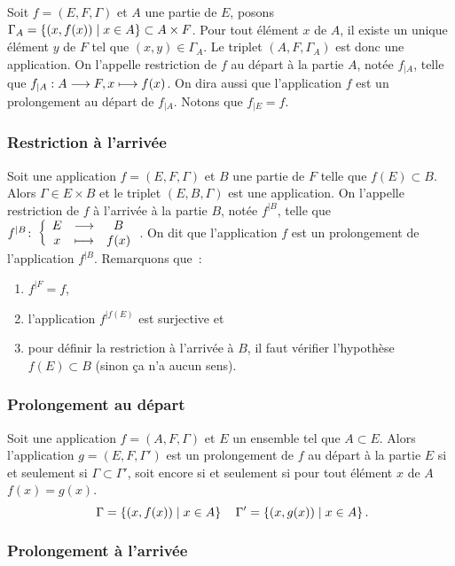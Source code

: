 Soit \(f=(E,F,\Gamma)\) et \(A\) une partie de \(E\), posons 
\(\Gamma_A=\left\{(x,f(x))\mathrel{}\middle|\mathrel{}x \in A\right\} \subset A \times F\). Pour tout élément 
\(x\) de \(A\), il existe un unique élément \(y\) de \(F\) tel que \((x,y) \in 
\Gamma_A\). Le triplet \((A,F, \Gamma_A)\) est donc une application. On 
l'appelle restriction de \(f\) au départ à la partie \(A\), notée \(f_{|A}\), 
telle que \(f_{|A}:A \longrightarrow F, x \longmapsto f(x)\). On dira aussi que l'application 
\(f\) est un prolongement au départ de \(f_{|A}\). Notons que \(f_{|E}=f\).

\subsubsection{Restriction à l'arrivée}
\label{chap3-subsubsec:restrictionarr}

Soit une application \(f=(E,F,\Gamma)\) et \(B\) une partie de \(F\) telle que 
\(f(E) \subset B\). Alors \(\Gamma \in E \times B\) et le triplet 
\((E,B,\Gamma)\) est une application. On l'appelle restriction de \(f\) à 
l'arrivée à la partie \(B\), notée \(f^{|B}\), telle que 
\(f^{|B}\colon \left\{\begin{array}{ccc} E & \longrightarrow &B\\ x & \longmapsto & f(x) \end{array} \right.\). On dit que l'application \(f\) est un 
prolongement de l'application \(f^{|B}\). Remarquons que~:
\begin{enumerate}
    \item \(f^{|F}=f\), 
    \item l'application \(f^{|f(E)}\) est surjective et 
    \item pour définir la restriction à l'arrivée à \(B\), il faut vérifier 
        l'hypothèse \(f(E) \subset B\) (sinon ça n'a aucun sens).
\end{enumerate}

\subsubsection{Prolongement au départ}
\label{chap3-subsubsec:prolongementdep}

Soit une application \(f=(A,F,\Gamma)\) et \(E\) un ensemble tel que \(A \subset 
E\). Alors l'application \(g=(E,F,\Gamma')\) est un prolongement de \(f\) au 
départ à la partie \(E\) si et seulement si \(\Gamma \subset \Gamma'\), soit 
encore si et seulement si pour tout élément \(x\) de \(A\) \(f(x)=g(x)\).
\begin{equation}\
    \Gamma=\left\{(x,f(x))\mathrel{}\middle|\mathrel{}x \in A\right\} \quad \Gamma'=\left\{(x,g(x))\mathrel{}\middle|\mathrel{}x \in A\right\}.
\end{equation}

\subsubsection{Prolongement à l'arrivée}
\label{chap3-subsubsec:prolongementarr}

